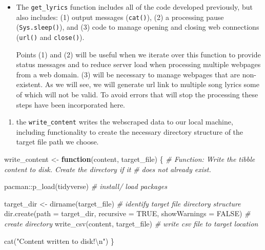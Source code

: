 \documentclass[
]{article}
\newenvironment{Shaded}{\begin{snugshade}}{\end{snugshade}}
\newcommand{\AttributeTok}[1]{\textcolor[rgb]{0.77,0.63,0.00}{#1}}
\newcommand{\CommentTok}[1]{\textcolor[rgb]{0.56,0.35,0.01}{\textit{#1}}}
\newcommand{\ConstantTok}[1]{\textcolor[rgb]{0.00,0.00,0.00}{#1}}
\newcommand{\ControlFlowTok}[1]{\textcolor[rgb]{0.13,0.29,0.53}{\textbf{#1}}}
\newcommand{\FunctionTok}[1]{\textcolor[rgb]{0.00,0.00,0.00}{#1}}
\newcommand{\NormalTok}[1]{#1}
\newcommand{\OtherTok}[1]{\textcolor[rgb]{0.56,0.35,0.01}{#1}}
\newcommand{\SpecialCharTok}[1]{\textcolor[rgb]{0.00,0.00,0.00}{#1}}
\newcommand{\StringTok}[1]{\textcolor[rgb]{0.31,0.60,0.02}{#1}}
\providecommand{\tightlist}{%
  \setlength{\itemsep}{0pt}\setlength{\parskip}{0pt}}
\newenvironment{rmdblock}[1]
  {\begin{shaded*}
  \begin{itemize}
  \renewcommand{\labelitemi}{
    \raisebox{-.5\height}[0pt][0pt]{
      {\setkeys{Gin}{width=2em,keepaspectratio}\texttt{[image: assets/images/\#1]}}
    }
  }
  \item
  }
  {
  \end{itemize}
  \end{shaded*}
  }
\newenvironment{rmdtip}
  {\begin{rmdblock}{tip}}
  {\end{rmdblock}}
\begin{document}
\begin{rmdtip}
The \texttt{get\_lyrics} function includes all of the code developed previously, but also includes: (1) output messages (\texttt{cat()}), (2) a processing pause (\texttt{Sys.sleep()}), and (3) code to manage opening and closing web connections (\texttt{url()} and \texttt{close()}).

Points (1) and (2) will be useful when we iterate over this function to provide status messages and to reduce server load when processing multiple webpages from a web domain. (3) will be necessary to manage webpages that are non-existent. As we will see, we will generate url link to multiple song lyrics some of which will not be valid. To avoid errors that will stop the processing these steps have been incorporated here.
\end{rmdtip}

\begin{enumerate}
\def\labelenumi{\arabic{enumi}.}
\setcounter{enumi}{1}
\tightlist
\item
  the \texttt{write\_content} writes the webscraped data to our local machine, including functionality to create the necessary directory structure of the target file path we choose.
\end{enumerate}

\begin{Shaded}
\begin{Highlighting}[]
\NormalTok{write\_content }\OtherTok{\textless{}{-}} \ControlFlowTok{function}\NormalTok{(content, target\_file) \{}
    \CommentTok{\# Function: Write the tibble content to disk. Create the directory if it}
    \CommentTok{\# does not already exist.}

\NormalTok{    pacman}\SpecialCharTok{::}\FunctionTok{p\_load}\NormalTok{(tidyverse)  }\CommentTok{\# install/ load packages}

\NormalTok{    target\_dir }\OtherTok{\textless{}{-}} \FunctionTok{dirname}\NormalTok{(target\_file)  }\CommentTok{\# identify target file directory structure}
    \FunctionTok{dir.create}\NormalTok{(}\AttributeTok{path =}\NormalTok{ target\_dir, }\AttributeTok{recursive =} \ConstantTok{TRUE}\NormalTok{, }\AttributeTok{showWarnings =} \ConstantTok{FALSE}\NormalTok{)  }\CommentTok{\# create directory}
    \FunctionTok{write\_csv}\NormalTok{(content, target\_file)  }\CommentTok{\# write csv file to target location}

    \FunctionTok{cat}\NormalTok{(}\StringTok{"Content written to disk!}\SpecialCharTok{\textbackslash{}n}\StringTok{"}\NormalTok{)}
\NormalTok{\}}
\end{Highlighting}
\end{Shaded}
\end{document}

